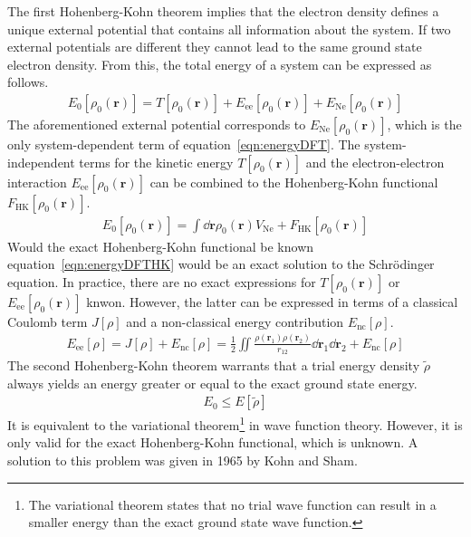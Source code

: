 The first Hohenberg-Kohn theorem implies that the electron density defines a
unique external potential that contains all information about the system. If
two external potentials are different they cannot lead to the same ground state
electron density. From this, the total energy of a system can be expressed as follows.
%
\begin{align}
    E_0\left[ \rho_0(\mathbf{r}) \right] = T\left[ \rho_0(\mathbf{r}) \right] + E_\text{ee} \left[ \rho_0(\mathbf{r}) \right] + E_\text{Ne} \left[ \rho_0(\mathbf{r}) \right]\label{eqn:energyDFT}
\end{align}
%
The aforementioned external potential corresponds to $E_\text{Ne} \left[
	\rho_0(\mathbf{r}) \right]$, which is the only system-dependent term of
equation~\eqref{eqn:energyDFT}. The system-independent terms for the kinetic
energy $T\left[ \rho_0(\mathbf{r}) \right]$ and the electron-electron
interaction $E_\text{ee} \left[ \rho_0(  \mathbf{r}) \right]$ can be combined
to the Hohenberg-Kohn functional $F_\text{HK}\left[ \rho_0(
\mathbf{r})\right]$.
%
\begin{align}
    E_0\left[ \rho_0(\mathbf{r}) \right] = \int\dd\mathbf{r}\rho_0(\mathbf{r})V_\text{Ne}+ F_\text{HK}\left[ \rho_0(\mathbf{r})\right]\label{eqn:energyDFTHK}
\end{align}
%
Would the exact Hohenberg-Kohn functional be known
equation~\eqref{eqn:energyDFTHK} would be an exact solution to the
Schr\"odinger equation. In practice, there are no exact expressions for
$T\left[ \rho_0(\mathbf{r}) \right]$ or $E_\text{ee} \left[ \rho_0(
\mathbf{r}) \right]$ knwon. However, the latter can be expressed in terms of a
classical Coulomb term $J\left[\rho\right]$ and a non-classical energy contribution
$E_\text{nc}\left[\rho\right]$.
%
\begin{align}
    E_\text{ee} \left[ \rho \right]=J\left[\rho\right]+E_\text{nc}\left[\rho\right]=\frac{1}{2}\iint\frac{\rho(\mathbf{r}_1)\rho(\mathbf{r}_2)}{r_{12}}\dd\mathbf{r}_1\dd\mathbf{r}_2+E_\text{nc}\left[\rho\right]
\end{align}
%
The second Hohenberg-Kohn theorem warrants that a trial energy density
$\widetilde{\rho}$ always yields an energy greater or equal to the exact ground
state energy.
%
\begin{align}
    E_0 \leq E\left[\widetilde{\rho}\right]
\end{align}
%
It is equivalent to the variational theorem\footnote{The variational theorem
states that no trial wave function can result in a smaller energy than the exact
ground state wave function.} in wave function theory. However, it is only valid
for the exact Hohenberg-Kohn functional, which is unknown. A solution to this
problem was given in 1965 by Kohn and Sham.

